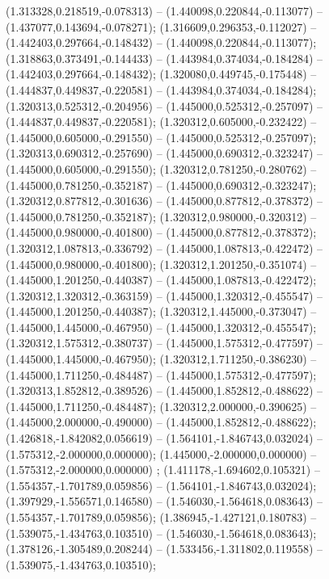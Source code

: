  (1.313328,0.218519,-0.078313) -- (1.440098,0.220844,-0.113077) -- (1.437077,0.143694,-0.078271);
 (1.316609,0.296353,-0.112027) -- (1.442403,0.297664,-0.148432) -- (1.440098,0.220844,-0.113077);
 (1.318863,0.373491,-0.144433) -- (1.443984,0.374034,-0.184284) -- (1.442403,0.297664,-0.148432);
 (1.320080,0.449745,-0.175448) -- (1.444837,0.449837,-0.220581) -- (1.443984,0.374034,-0.184284);
 (1.320313,0.525312,-0.204956) -- (1.445000,0.525312,-0.257097) -- (1.444837,0.449837,-0.220581);
 (1.320312,0.605000,-0.232422) -- (1.445000,0.605000,-0.291550) -- (1.445000,0.525312,-0.257097);
 (1.320313,0.690312,-0.257690) -- (1.445000,0.690312,-0.323247) -- (1.445000,0.605000,-0.291550);
 (1.320312,0.781250,-0.280762) -- (1.445000,0.781250,-0.352187) -- (1.445000,0.690312,-0.323247);
 (1.320312,0.877812,-0.301636) -- (1.445000,0.877812,-0.378372) -- (1.445000,0.781250,-0.352187);
 (1.320312,0.980000,-0.320312) -- (1.445000,0.980000,-0.401800) -- (1.445000,0.877812,-0.378372);
 (1.320312,1.087813,-0.336792) -- (1.445000,1.087813,-0.422472) -- (1.445000,0.980000,-0.401800);
 (1.320312,1.201250,-0.351074) -- (1.445000,1.201250,-0.440387) -- (1.445000,1.087813,-0.422472);
 (1.320312,1.320312,-0.363159) -- (1.445000,1.320312,-0.455547) -- (1.445000,1.201250,-0.440387);
 (1.320312,1.445000,-0.373047) -- (1.445000,1.445000,-0.467950) -- (1.445000,1.320312,-0.455547);
 (1.320312,1.575312,-0.380737) -- (1.445000,1.575312,-0.477597) -- (1.445000,1.445000,-0.467950);
 (1.320312,1.711250,-0.386230) -- (1.445000,1.711250,-0.484487) -- (1.445000,1.575312,-0.477597);
 (1.320313,1.852812,-0.389526) -- (1.445000,1.852812,-0.488622) -- (1.445000,1.711250,-0.484487);
 (1.320312,2.000000,-0.390625) -- (1.445000,2.000000,-0.490000) -- (1.445000,1.852812,-0.488622);
 (1.426818,-1.842082,0.056619) -- (1.564101,-1.846743,0.032024) -- (1.575312,-2.000000,0.000000);
 (1.445000,-2.000000,0.000000) -- (1.575312,-2.000000,0.000000) ;
 (1.411178,-1.694602,0.105321) -- (1.554357,-1.701789,0.059856) -- (1.564101,-1.846743,0.032024);
 (1.397929,-1.556571,0.146580) -- (1.546030,-1.564618,0.083643) -- (1.554357,-1.701789,0.059856);
 (1.386945,-1.427121,0.180783) -- (1.539075,-1.434763,0.103510) -- (1.546030,-1.564618,0.083643);
 (1.378126,-1.305489,0.208244) -- (1.533456,-1.311802,0.119558) -- (1.539075,-1.434763,0.103510);
